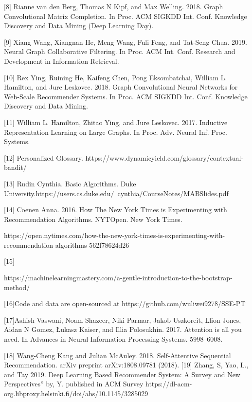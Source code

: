 \documentclass[english,twoside,censored,tkt]{HYthesisML}
\begin{document}
[8]	Rianne van den Berg, Thomas N Kipf, and Max Welling. 2018. Graph Convolutional Matrix Completion. In Proc. ACM SIGKDD Int. Conf. Knowledge Discovery
and Data Mining (Deep Learning Day).

[9]	Xiang Wang, Xiangnan He, Meng Wang, Fuli Feng, and Tat-Seng Chua. 2019. Neural Graph Collaborative Filtering. In Proc. ACM Int. Conf. Research and Development in Information Retrieval.

[10] Rex Ying, Ruining He, Kaifeng Chen, Pong Eksombatchai, William L. Hamilton, and Jure Leskovec. 2018. Graph Convolutional Neural Networks for Web-Scale Recommender Systems. In Proc. ACM SIGKDD Int. Conf. Knowledge Discovery and Data Mining.

[11] William L. Hamilton, Zhitao Ying, and Jure Leskovec. 2017. Inductive Representation Learning on Large Graphs. In Proc. Adv. Neural Inf. Proc. Systems.

[12] Personalized Glossary. https://www.dynamicyield.com/glossary/contextual-bandit/

[13] Rudin Cynthia. Basic Algorithms. Duke   
University.https://users.cs.duke.edu/~cynthia/CourseNotes/MABSlides.pdf

[14] Coenen Anna. 2016. How The New York Times is Experimenting with Recommendation Algorithms. NYTOpen. New York Times.
\begin{sloppypar}
https://open.nytimes.com/how-the-new-york-times-is-experimenting-with-recommendation-algorithms-562f78624d26
\end{sloppypar}

[15]
\begin{sloppypar}
https://machinelearningmastery.com/a-gentle-introduction-to-the-bootstrap-method/
\end{sloppypar}

[16]Code and data are open-sourced at
https://github.com/wuliwei9278/SSE-PT

[17]Ashish Vaswani, Noam Shazeer, Niki Parmar, Jakob Uszkoreit, Llion Jones, Aidan N Gomez, Łukasz Kaiser, and Illia Polosukhin. 2017. Attention is all you need. In Advances in Neural Information Processing Systems. 5998–6008.

[18] Wang-Cheng Kang and Julian McAuley. 2018. Self-Attentive Sequential Recommendation. arXiv preprint arXiv:1808.09781 (2018).
[19] Zhang, S, Yao, L., and Tay 2019. Deep Learning Based Recommender System: A Survey and New Perspectives” by, Y. published in ACM Survey 
\newline
https://dl-acm-org.libproxy.helsinki.fi/doi/abs/10.1145/3285029
\end{document}

